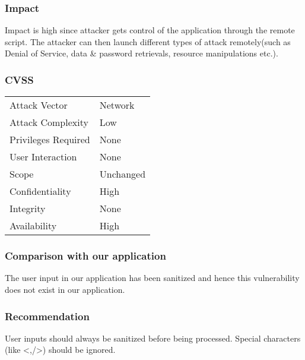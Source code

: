 \subsubsection{Impact}
Impact is high since attacker gets control of the application through the remote script. The attacker can then launch different types of attack remotely(such as Denial of Service, data \& password retrievals, resource manipulations etc.).

\subsubsection{CVSS}
\begin{tabular}{l | l}
Attack Vector		& Network \\
Attack Complexity	& Low \\
Privileges Required & None \\
User Interaction	& None \\
Scope				& Unchanged \\
Confidentiality		& High \\
Integrity			& None \\
Availability		& High
\end{tabular}

\subsubsection{Comparison with our application}
The user input in our application has been sanitized and hence this vulnerability does not exist in our application.

\subsubsection{Recommendation}
User inputs should always be sanitized before being processed. Special characters (like <,/>) should be ignored.
\clearpage